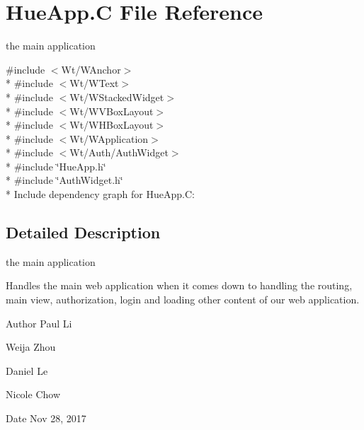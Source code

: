 \hypertarget{HueApp_8C}{}\section{Hue\+App.\+C File Reference}
\label{HueApp_8C}


the main application  


{\ttfamily \#include $<$Wt/\+W\+Anchor$>$}\\*
{\ttfamily \#include $<$Wt/\+W\+Text$>$}\\*
{\ttfamily \#include $<$Wt/\+W\+Stacked\+Widget$>$}\\*
{\ttfamily \#include $<$Wt/\+W\+V\+Box\+Layout$>$}\\*
{\ttfamily \#include $<$Wt/\+W\+H\+Box\+Layout$>$}\\*
{\ttfamily \#include $<$Wt/\+W\+Application$>$}\\*
{\ttfamily \#include $<$Wt/\+Auth/\+Auth\+Widget$>$}\\*
{\ttfamily \#include \char`\"{}Hue\+App.\+h\char`\"{}}\\*
{\ttfamily \#include \char`\"{}Auth\+Widget.\+h\char`\"{}}\\*
Include dependency graph for Hue\+App.\+C\+:


\subsection{Detailed Description}
the main application 

Handles the main web application when it comes down to handling the routing, main view, authorization, login and loading other content of our web application.

\begin{DoxyAuthor}{Author}
Paul Li 

Weija Zhou 

Daniel Le 

Nicole Chow 
\end{DoxyAuthor}
\begin{DoxyDate}{Date}
Nov 28, 2017 
\end{DoxyDate}
